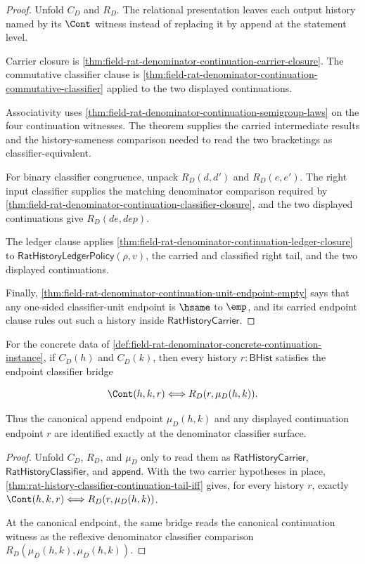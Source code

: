 \begin{proof}
Unfold $C_D$ and $R_D$. The relational presentation leaves each output
history named by its $\Cont$ witness instead of replacing it by append at the
statement level.

Carrier closure is
\autoref{thm:field-rat-denominator-continuation-carrier-closure}. The
commutative classifier clause is
\autoref{thm:field-rat-denominator-continuation-commutative-classifier}
applied to the two displayed continuations.

Associativity uses
\autoref{thm:field-rat-denominator-continuation-semigroup-laws} on the four
continuation witnesses. The theorem supplies the carried intermediate results
and the history-sameness comparison needed to read the two bracketings as
classifier-equivalent.

For binary classifier congruence, unpack $R_D(d,d')$ and $R_D(e,e')$. The
right input classifier supplies the matching denominator comparison required
by \autoref{thm:field-rat-denominator-continuation-classifier-closure}, and
the two displayed continuations give $R_D(de,dep)$.

The ledger clause applies
\autoref{thm:field-rat-denominator-continuation-ledger-closure} to
$\mathsf{RatHistoryLedgerPolicy}(\rho,v)$, the carried and classified right
tail, and the two displayed continuations.

Finally,
\autoref{thm:field-rat-denominator-continuation-unit-endpoint-empty} says that
any one-sided classifier-unit endpoint is $\hsame$ to $\emp$, and its carried
endpoint clause rules out such a history inside $\mathsf{RatHistoryCarrier}$.
\end{proof}

\begin{theorem}
\label{thm:field-rat-denominator-functional-relational-instance-equivalence}
For the concrete data of
\autoref{def:field-rat-denominator-concrete-continuation-instance}, if
$C_D(h)$ and $C_D(k)$, then every history $r:\mathsf{BHist}$ satisfies the
endpoint classifier bridge

$$
\Cont(h,k,r)\Longleftrightarrow R_D(r,\mu_D(h,k)).
$$

Thus the canonical append endpoint $\mu_D(h,k)$ and any displayed continuation
endpoint $r$ are identified exactly at the denominator classifier surface.
\end{theorem}
\begin{proof}
Unfold $C_D$, $R_D$, and $\mu_D$ only to read them as
$\mathsf{RatHistoryCarrier}$, $\mathsf{RatHistoryClassifier}$, and
$\mathsf{append}$. With the two carrier hypotheses in place,
\autoref{thm:rat-history-classifier-continuation-tail-iff} gives, for every
history $r$, exactly
$\Cont(h,k,r)\Longleftrightarrow R_D(r,\mu_D(h,k))$.

At the canonical endpoint, the same bridge reads the canonical continuation
witness as the reflexive denominator classifier comparison
$R_D(\mu_D(h,k),\mu_D(h,k))$.
\end{proof}

